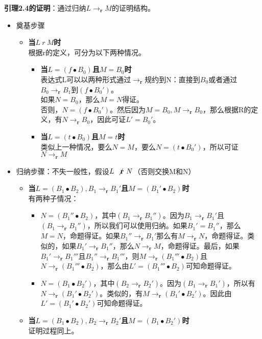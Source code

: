\documentclass{book}
\def\r{\mathbf{r}}
\begin{document}
\begin{adjustwidth}{20pt}{20pt}
\textbf{引理2.4的证明}：通过归纳$L\rightarrow_\r M$的证明结构。
\begin{itemize}
  \item 奠基步骤
  \begin{itemize}
    \item \textbf{当$L\ r\ M$时}\\
    根据r的定义，可分为以下两种情况。
    \begin{itemize}
      \item \textbf{当$L=(f\bullet B_0)$且$M=B_0$时}\\
      表达式L可以以两种形式通过$\rightarrow_\r $规约到N：直接到$B_0$或者通过$B_0\rightarrow_\r B_1$到$(f\bullet B_0')$。\\
      如果$N=B_0$，那么$M=N$得证。\\
      否则，$N=(f\bullet B_0')$。然后因为$M=B_0,M\rightarrow_\r B_0$，那么根据R的定义，有$N\rightarrow_\r B_0$，因此可证$L'=B_0'$。
      \item \textbf{当$L=(t\bullet B_0)$且$M=t$时}\\
      类似上一种情况，要么$N=M$，要么$N=(t\bullet B_0')$，所以可证$N\rightarrow_\r M$
    \end{itemize}
  \end{itemize}
  \item 归纳步骤：不失一般性，假设$L\ \not \mathbf{r}\ N$（否则交换M和N）
  \begin{itemize}
    \item \textbf{当$L=(B_1\bullet B_2),B_1\rightarrow_\r B_1'$且$M=(B_1'\bullet B_2)$时}\\
    有两种子情况：
    \begin{itemize}
      \item $N=(B_1''\bullet B_2)$，其中$(B_1\rightarrow_\r B_1'')$。因为$B_1\rightarrow_\r B_1'$且$(B_1\rightarrow_\r B_1'')$，所以我们可以使用归纳。如果$B_1'=B_1''$，那么$M=N$，命题得证。如果$B_1''\rightarrow_\r B_1'$那么有$M\rightarrow_\r N$，命题得证。类似的，如果$B_1'\rightarrow_\r B_1''$，那么$N\rightarrow_\r M$，命题得证。最后，如果$B_1'\rightarrow_\r B_1'''$且$B_1''\rightarrow_\r B_1'''$，则$M\rightarrow_\r (B_1'''\bullet B_2)$且$N\rightarrow_\r (B_1'''\bullet B_2)$，那么由$L'=(B_1'''\bullet B_2)$可知命题得证。
      \item $N=(B_1\bullet B_2')$，其中$(B_2\rightarrow_\r B_2')$。因为$(B_1\rightarrow_\r B_1')$，所以有$ N\rightarrow_\r (B_1'\bullet B_2')$。类似的，有$ M\rightarrow_\r (B_1'\bullet B_2')$。因此由$L'=(B_1'\bullet B_2')$可知命题得证。
    \end{itemize}
    \item \textbf{当$L=(B_1\bullet B_2),B_2\rightarrow_\r B_2'$且$M=(B_1\bullet B_2')$时}\\
    证明过程同上。\\
  \end{itemize}
\end{itemize}
\end{adjustwidth}
\end{document}
